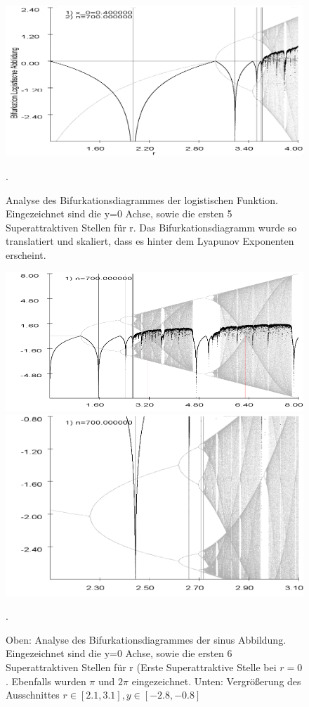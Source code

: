 \documentclass{scrartcl}
\begin{document}
\begin{figure}
\centering
\includegraphics[scale=0.45]{iteration/bifurk-log-lyapunov-periode}
\caption{Analyse des Bifurkationsdiagrammes der logistischen Funktion. Eingezeichnet sind die y=0 Achse, sowie die ersten 5 Superattraktiven Stellen für r. Das Bifurkationsdiagramm wurde so translatiert und skaliert, dass es hinter dem Lyapunov Exponenten erscheint.}. 
\end{figure}



\begin{figure}
\centering
\includegraphics[scale=0.55]{bifurkation-sin}
\includegraphics[scale=0.47]{bifurkation-sin-zoom}
\caption{Oben: Analyse des Bifurkationsdiagrammes der sinus Abbildung. Eingezeichnet sind die y=0 Achse, sowie die ersten 6 Superattraktiven Stellen für r (Erste Superattraktive Stelle bei $r=0$. Ebenfalls wurden $\pi$ und $2\pi$ eingezeichnet. Unten: Vergrößerung des Ausschnittes $r \in [2.1,3.1], y\in[-2.8,-0.8]$}. 
\end{figure}
\end{document}
